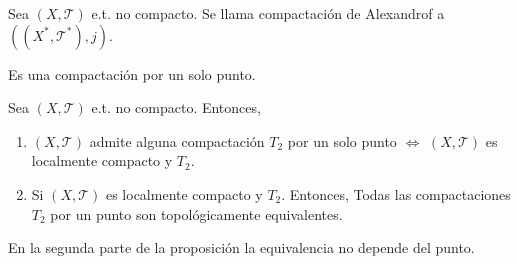 \begin{defn}
  Sea $( X, \mathcal{T} )$ e.t. no compacto. Se llama compactación de Alexandrof a $(( X^*, \mathcal{T}^* ), j)$.
\end{defn}

\begin{obs}
  Es una compactación por un solo punto.
\end{obs}

\begin{prop}
  Sea $( X, \mathcal{T} )$ e.t. no compacto. Entonces,
  \begin{enumerate}[label=(\roman*)]
    \item $( X, \mathcal{T} )$ admite alguna compactación $T_{2}$ por un solo punto $\Leftrightarrow$ $( X, \mathcal{T} )$ es localmente compacto y $T_{2}$.
    \item  Si $( X, \mathcal{T} )$ es localmente compacto y $T_{2}$. Entonces, Todas las compactaciones $T_{2}$ por un punto son topológicamente equivalentes.
  \end{enumerate}
\end{prop}

\begin{obs}
  En la segunda parte de la proposición la equivalencia no depende del punto.
\end{obs}

